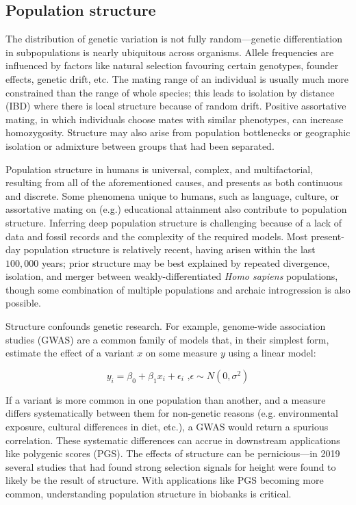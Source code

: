 \subsection{Population structure}

The distribution of genetic variation is not fully random---genetic differentiation in subpopulations is nearly ubiquitous across organisms. Allele frequencies are influenced by factors like natural selection favouring certain genotypes, founder effects, genetic drift, etc\citep{hartl2007principles_6}. The mating range of an individual is usually much more constrained than the range of whole species; this leads to isolation by distance (IBD) where there is local structure because of random drift\citep{wright_isolation_1943}. Positive assortative mating, in which individuals choose mates with similar phenotypes, can increase homozygosity\citep{hartl2007principles_6}. Structure may also arise from population bottlenecks or geographic isolation\citep{crow_kimura_1970_3} or admixture between groups that had been separated\citep{crow_kimura_1970_9}. 

Population structure in humans is universal, complex, and multifactorial, resulting from all of the aforementioned causes, and presents as both continuous and discrete\citep{peter_geometric_2022}. Some phenomena unique to humans, such as language\citep{barbujani_zones_1990}, culture\citep{campbell_evolution_2010}, or assortative mating on (e.g.) educational attainment\citep{robinson_genetic_2017} also contribute to population structure. Inferring deep population structure is challenging because of a lack of data and fossil records and the complexity of the required models. Most present-day population structure is relatively recent, having arisen within the last $100,000$ years; prior structure may be best explained by repeated divergence, isolation, and merger between weakly-differentiated \textit{Homo sapiens} populations, though some combination of multiple populations and archaic introgression is also possible\citep{ragsdale_weakly_2023}.

Structure confounds genetic research. For example, genome-wide association studies (GWAS) are a common family of models that, in their simplest form, estimate the effect of a variant $x$ on some measure $y$ using a linear model:

$$ y_{i} = \beta_0 + \beta_{1}x_{i} + \epsilon_{i} \text{ ,} \epsilon \sim N(0,\sigma^{2})$$

If a variant is more common in one population than another, and a measure differs systematically between them for non-genetic reasons (e.g. environmental exposure, cultural differences in diet, etc.), a GWAS would return a spurious correlation\citep{price_principal_2006}. These systematic differences can accrue in downstream applications like polygenic scores (PGS)\citep{zaidi_demographic_2020}. The effects of structure can be pernicious---in 2019 several studies that had found strong selection signals for height were found to likely be the result of structure\citep{berg_reduced_2019}. With applications like PGS becoming more common, understanding population structure in biobanks is critical\citep{kaplan_polygenic_2022}.


